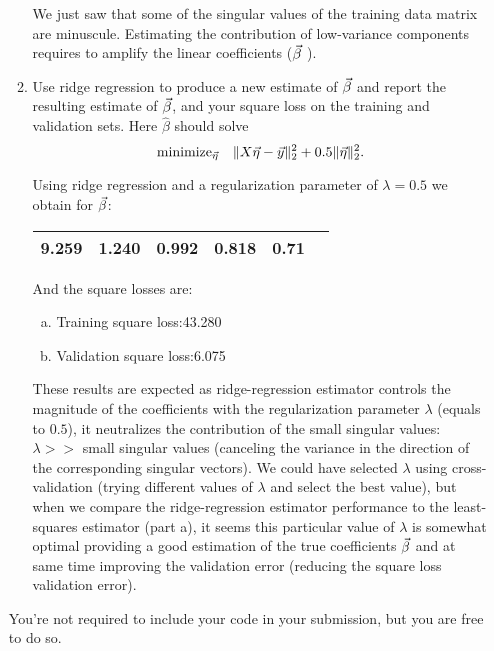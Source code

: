 \documentclass[12pt,twoside]{article}
\begin{document}
\begin{enumerate}
\begin{enumerate}
We just saw that some of the singular values of the training data matrix are minuscule. 
Estimating the contribution of low-variance components requires to amplify the linear coefficients ($\vec{\beta}$ ).
    
  \item Use ridge regression to produce a new estimate of $\vec{\beta}$
    and report the resulting estimate of $\vec{\beta}$, and
    your square loss on the training and validation sets.  Here
    $\hat{\beta}$ should solve
    $$\text{minimize}_{\vec{\eta}}\quad \|X\vec{\eta}-\vec{y}\|_2^2 + 0.5\|\vec{\eta}\|_2^2.$$
    
    Using ridge regression and a regularization parameter of $\lambda=0.5$ we obtain for $\vec{\beta}$:
     \begin{center}
    		\begin{tabular}{ | c | c | c | c | c | c | }
		\hline
			9.259 & 1.240 & 0.992 & 0.818 &  0.71 \\ 
		\hline
    	\end{tabular}
    \end{center}
    And the square losses are:
    \begin{enumerate}[(a)]
	\item Training square loss:43.280
	\item Validation square loss:6.075
    \end{enumerate}
  
  These results are expected as ridge-regression estimator controls the magnitude of the coefficients with the regularization parameter $\lambda$ (equals to $0.5$),
  it neutralizes the contribution of the small singular values: $\lambda >> $ small singular values (canceling the variance in the direction of the corresponding singular vectors).
  We could have selected $\lambda$ using cross-validation (trying different values of $\lambda$ and select the best value), 
  but  when we compare the ridge-regression estimator performance to the least-squares estimator (part a),
  it seems this particular value of $\lambda$ is somewhat optimal providing a good estimation of the true coefficients
   $\vec{\beta}$ and at same time improving the validation error (reducing the square loss validation error).
  

  \end{enumerate}
You're not required to include your code in your submission, but you are free to do so. 
 \end{enumerate}
 
\end{document}
